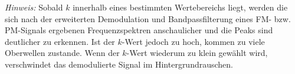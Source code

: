 \documentclass[
a4paper,
12pt,
pagesize,
ngerman
]{scrartcl}
\begin{document}
	\emph{Hinweis:} Sobald $k$ innerhalb eines bestimmten Wertebereichs liegt, werden die sich nach der erweiterten Demodulation und Bandpassfilterung eines FM- bzw. PM-Signals ergebenen Frequenzspektren anschaulicher und die Peaks sind deutlicher zu erkennen.
	Ist der $k$-Wert jedoch zu hoch, kommen zu viele Oberwellen zustande.
	Wenn der $k$-Wert wiederum zu klein gewählt wird, verschwindet das demodulierte Signal im Hintergrundrauschen.
	
	
	
	\printbibliography
	
	
\end{document}
